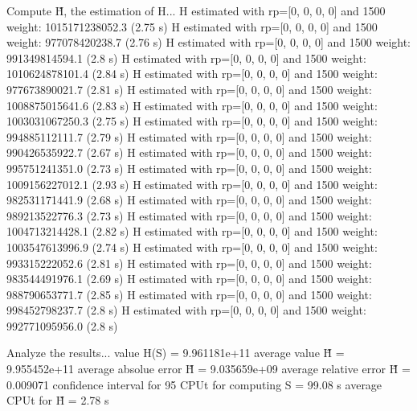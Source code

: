 Compute H̃, the estimation of H...
  H estimated with rp=[0, 0, 0, 0] and 1500 weight:  1015171238052.3  (2.75 s)
  H estimated with rp=[0, 0, 0, 0] and 1500 weight:  977078420238.7  (2.76 s)
  H estimated with rp=[0, 0, 0, 0] and 1500 weight:  991349814594.1  (2.8 s)
  H estimated with rp=[0, 0, 0, 0] and 1500 weight:  1010624878101.4  (2.84 s)
  H estimated with rp=[0, 0, 0, 0] and 1500 weight:  977673890021.7  (2.81 s)
  H estimated with rp=[0, 0, 0, 0] and 1500 weight:  1008875015641.6  (2.83 s)
  H estimated with rp=[0, 0, 0, 0] and 1500 weight:  1003031067250.3  (2.75 s)
  H estimated with rp=[0, 0, 0, 0] and 1500 weight:  994885112111.7  (2.79 s)
  H estimated with rp=[0, 0, 0, 0] and 1500 weight:  990426535922.7  (2.67 s)
  H estimated with rp=[0, 0, 0, 0] and 1500 weight:  995751241351.0  (2.73 s)
  H estimated with rp=[0, 0, 0, 0] and 1500 weight:  1009156227012.1  (2.93 s)
  H estimated with rp=[0, 0, 0, 0] and 1500 weight:  982531171441.9  (2.68 s)
  H estimated with rp=[0, 0, 0, 0] and 1500 weight:  989213522776.3  (2.73 s)
  H estimated with rp=[0, 0, 0, 0] and 1500 weight:  1004713214428.1  (2.82 s)
  H estimated with rp=[0, 0, 0, 0] and 1500 weight:  1003547613996.9  (2.74 s)
  H estimated with rp=[0, 0, 0, 0] and 1500 weight:  993315222052.6  (2.81 s)
  H estimated with rp=[0, 0, 0, 0] and 1500 weight:  983544491976.1  (2.69 s)
  H estimated with rp=[0, 0, 0, 0] and 1500 weight:  988790653771.7  (2.85 s)
  H estimated with rp=[0, 0, 0, 0] and 1500 weight:  998452798237.7  (2.8 s)
  H estimated with rp=[0, 0, 0, 0] and 1500 weight:  992771095956.0  (2.8 s)

Analyze the results...
  value H(S)                  = 9.961181e+11 
  average value H̃             = 9.955452e+11 
  average absolue error H̃     = 9.035659e+09 
  average relative error H̃    = 0.009071 
  confidence interval for 95%
  CPUt for computing S         = 99.08 s
  average CPUt for H̃           = 2.78 s

